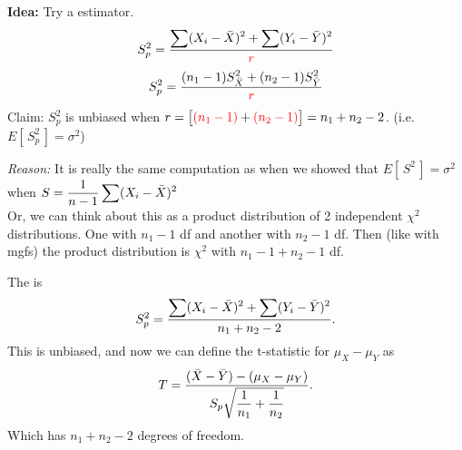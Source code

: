 \begin{enumerate}[label=\textcircled{\raisebox{-1pt}{\arabic*}}]
    \nl {}

    \nnl \textbf{Idea:} Try a  estimator.
    $$S_p^2 = \dfrac{\displaystyle \sum(X_i - \bar{X})^2 + \sum(Y_i-\bar{Y})^2}{\color{red}{r}\color{black}}$$
    $$S_p^2 = \dfrac{\displaystyle (n_1-1) S_{\bar{X}}^2 + (n_2-1) S_{\bar{Y}}^2}{\color{red}{r}\color{black}}$$
    Claim: $S_p^2$ is unbiased when $r = \big[ \color{red}{(n_1-1)}\color{black} + \color{red}{(n_2-1)}\color{black} \big] = n_1 + n_2 -2$. (i.e. $E[\,S^2_p\,] = \sigma^2 $)

    \nl \textit{Reason:} It is really the same computation as when we showed that $E[\,S^2\,] = \sigma^2$ when $S = \dfrac{1}{n-1}\displaystyle \sum(X_i-\bar{X})^2$\\Or, we can think about this as a product distribution of 2 independent $\chi^2$ distributions. One with $n_1-1$ df and another with $n_2-1$ df. Then (like with mgfs) the product distribution is $\chi^2$ with $n_1 - 1 + n_2 - 1$ df.

     The  is
    $$S_p^2 = \dfrac{\displaystyle \sum(X_i - \bar{X})^2 + \sum(Y_i-\bar{Y})^2}{n_1 + n_2 -2}.$$
    This is unbiased, and now we can define the t-statistic for $\mu_X - \mu_Y$ as
    $$T = \dfrac{(\bar{X}-\bar{Y})-(\mu_X-\mu_Y)}{S_p \displaystyle \sqrt{\dfrac{1}{n_1} + \dfrac{1}{n_2}}}.$$
    Which has $n_1 + n_2 - 2$ degrees of freedom.
\end{enumerate}